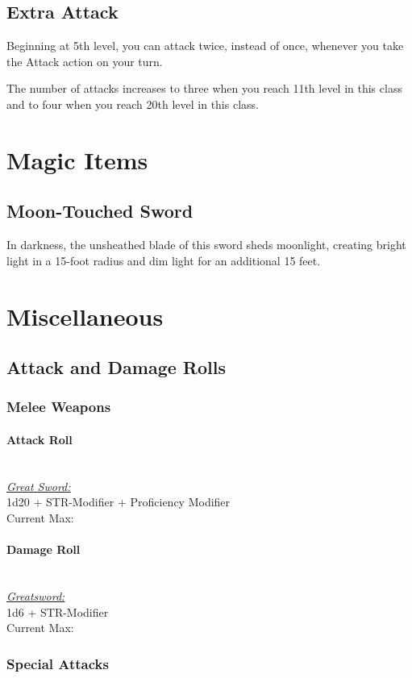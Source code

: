 {\subsection*{Extra Attack}
Beginning at 5th level, you can attack twice, instead of once, whenever you take the Attack action on your turn.

The number of attacks increases to three when you reach 11th level in this class and to four when you reach 20th level in this class.

\section*{Magic Items}
\subsection*{Moon-Touched Sword}
In darkness, the unsheathed blade of this sword sheds moonlight, creating bright light in a 15-foot radius and dim light for an additional 15 feet.
\vfill\eject
\section*{Miscellaneous}
\subsection*{Attack and Damage Rolls}
\subsubsection*{Melee Weapons}
\paragraph*{Attack Roll}\hfill\\
\underline{\textit{Great Sword:}}\\
1d20 + STR-Modifier + Proficiency Modifier\\
\indent Current Max: 
\paragraph*{Damage Roll}\hfill\\
\underline{\textit{Greatsword:}}\\
1d6 + STR-Modifier\\
\indent Current Max: 
\subsubsection*{Special Attacks}
}
